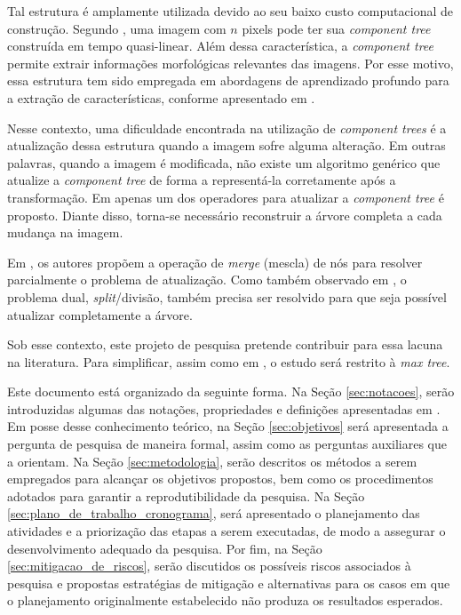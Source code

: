 Tal estrutura é amplamente utilizada devido ao seu baixo custo computacional
de construção. Segundo \cite{najman_building_2006}, uma imagem com $n$
pixels pode ter sua \textit{component tree} construída em tempo quasi-linear.
Além dessa característica, a \textit{component tree} permite extrair
informações morfológicas relevantes das imagens. Por esse motivo, essa
estrutura tem sido empregada em abordagens de aprendizado profundo para a
extração de características, conforme apresentado em
\cite{alves_image_2020, farfan_cabrera_segmentation_2021, kerautret_combining_2023}.


Nesse contexto, uma dificuldade encontrada na utilização de
\textit{component trees} é a atualização dessa estrutura quando a imagem sofre
alguma alteração. Em outras palavras, quando a imagem é modificada, não existe
um algoritmo genérico que atualize a \textit{component tree} de forma a representá-la
corretamente após a transformação. Em \cite{luz_alves_component_2026} apenas
um dos operadores para atualizar a \textit{component tree} é proposto. Diante disso, torna-se necessário
reconstruir a árvore completa a cada mudança na imagem.

Em \cite{luz_alves_component_2026}, os autores propõem a operação de
\textit{merge} (mescla) de nós para resolver parcialmente o problema de
atualização. Como também observado em \cite{luz_alves_component_2026}, o
problema dual, \textit{split}/divisão, também precisa ser resolvido para que
seja possível atualizar completamente a árvore.

Sob esse contexto, este projeto de pesquisa pretende contribuir para essa
lacuna na literatura. Para simplificar, assim como em
\cite{luz_alves_component_2026}, o estudo será restrito à
\textit{max tree}.

Este documento está organizado da seguinte forma. Na Seção
\ref{sec:notacoes}, serão introduzidas algumas das notações, propriedades e
definições apresentadas em \cite{luz_alves_component_2026}. Em posse desse
conhecimento teórico, na Seção \ref{sec:objetivos} será apresentada a
pergunta de pesquisa de maneira formal, assim como as perguntas auxiliares que
a orientam. Na Seção \ref{sec:metodologia}, serão descritos os métodos a
serem empregados para alcançar os objetivos propostos, bem como os
procedimentos adotados para garantir a reprodutibilidade da pesquisa. Na Seção
\ref{sec:plano_de_trabalho_cronograma}, será apresentado o planejamento das
atividades e a priorização das etapas a serem executadas, de modo a assegurar
o desenvolvimento adequado da pesquisa. Por fim, na Seção
\ref{sec:mitigacao_de_riscos}, serão discutidos os possíveis riscos
associados à pesquisa e propostas estratégias de mitigação e alternativas para
os casos em que o planejamento originalmente estabelecido não produza os
resultados esperados.

